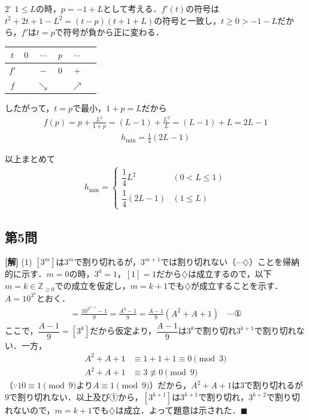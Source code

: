 \documentclass[../main.tex]{subfiles}
\begin{document}
$2^\circ$ $1\le L$の時，$p=-1+L$として考える．$f'(t)$の符号は$t^2+2t+1-L^2=(t-p)(t+1+L)$の符号と一致し，$t\ge0>-1-L$だから，$f'$は$t=p$で符号が負から正に変わる．
\begin{center}
  \begin{tabular}{c|ccccc}
    $t$ & $0$ & $\cdots$ & $p$ & $\cdots$ \\
    \hline
    $f'$ & & $-$ & $0$ & $+$ \\
    $f$ & & $\searrow$ & & $\nearrow$ \\
  \end{tabular}
\end{center}
したがって，$t=p$で最小，$1+p=L$だから
\begin{align*}
  f(p)=p+\frac{L^2}{1+p}=(L-1)+\frac{L^2}L=(L-1)+L=2L-1
\end{align*}
\begin{align*}
  h_{\min}=\frac14(2L-1)
\end{align*}

以上まとめて
\begin{align*}
  h_{\min}=
  \begin{cases}\dfrac14L^2&(0<L\le1)\\[2mm]\dfrac14(2L-1)&(1\le L)
  \end{cases}
\end{align*}

\bigskip

\subsection*{第5問}

\noindent
{\bf [解]}
(1) $[3^m]$は$3^m$で割り切れるが，$3^{m+1}$では割り切れない（$\cdots\diamondsuit$）ことを帰納的に示す．$m=0$の時，$3^0=1$，$[1]=1$だから$\diamondsuit$は成立するので，以下$m=k\in\mathbb Z_{\ge0}$での成立を仮定し，$m=k+1$でも$\diamondsuit$が成立することを示す．$A=10^{3^k}$とおく．
\begin{align*}
  [3^{k+1}]=\frac{10^{3^{k+1}}-1}9=\frac{A^3-1}9=\frac{A-1}9(A^2+A+1)\quad\cdots①
\end{align*}
ここで，$\dfrac{A-1}9=[3^k]$だから仮定より，$\dfrac{A-1}9$は$3^k$で割り切れ$3^{k+1}$で割り切れない．一方，
\begin{align*}
  A^2+A+1&\equiv1+1+1\equiv0\pmod3\\
  A^2+A+1&\equiv3\not\equiv0\pmod9
\end{align*}
（$\because10\equiv1\pmod9$より$A\equiv1\pmod9$）だから，$A^2+A+1$は$3$で割り切れるが$9$で割り切れない．以上及び①から，$[3^{k+1}]$は$3^{k+1}$で割り切れ，$3^{k+2}$で割り切れないので，$m=k+1$でも$\diamondsuit$は成立．よって題意は示された．$\blacksquare$
\end{document}
